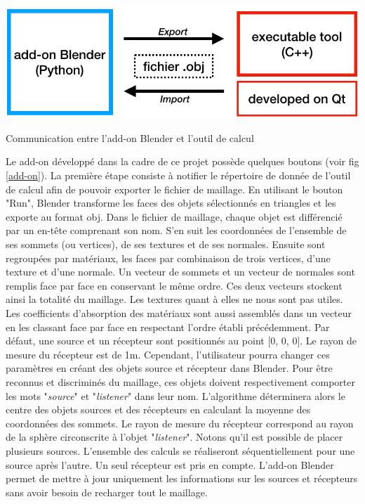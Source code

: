 \begin{figureth}
	\includegraphics[width=0.7\linewidth]{images/logiciel}
	\caption{Communication entre l'add-on Blender et l'outil de calcul}
	\label{logiciel}
\end{figureth}


Le add-on développé dans la cadre de ce projet possède quelques boutons (voir fig \ref{add-on}). La première étape consiste à notifier le répertoire de donnée de l'outil de calcul afin de pouvoir exporter le fichier de maillage. En utilisant le bouton "Run", Blender transforme les faces des objets sélectionnés en triangles et les exporte au format \gls{obj}. Dans le fichier de maillage, chaque objet est différencié par un en-tête comprenant son nom. S'en suit les coordonnées de l'ensemble de ses sommets (ou vertices), de ses textures et de ses normales. Ensuite sont regroupées par matériaux, les faces par combinaison de trois vertices, d'une texture et d'une normale. Un vecteur de sommets et un vecteur de normales sont remplis face par face en conservant le même ordre. Ces deux vecteurs stockent ainsi la totalité du maillage. Les textures quant à elles ne nous sont pas utiles. Les coefficients d'absorption des matériaux sont aussi assemblés dans un vecteur en les classant face par face en respectant l'ordre établi précédemment. Par défaut, une source et un récepteur sont positionnés au point [0, 0, 0]. Le rayon de mesure du récepteur est de 1m. Cependant, l'utilisateur pourra changer ces paramètres en créant des objets source et récepteur dans Blender. Pour être reconnus et discriminés du maillage, ces objets doivent respectivement comporter les mots "\textit{source}" et "\textit{listener}" dans leur nom. L'algorithme déterminera alors le centre des objets sources et des récepteurs en calculant la moyenne des coordonnées des sommets. Le rayon de mesure du récepteur correspond au rayon de la sphère circonscrite à l'objet "\textit{listener}". Notons qu'il est possible de placer plusieurs sources. L'ensemble des calculs se réaliseront séquentiellement pour une source après l'autre. Un seul récepteur est pris en compte. L'add-on Blender permet de mettre à jour uniquement les informations sur les sources et récepteurs sans avoir besoin de recharger tout le maillage. 
